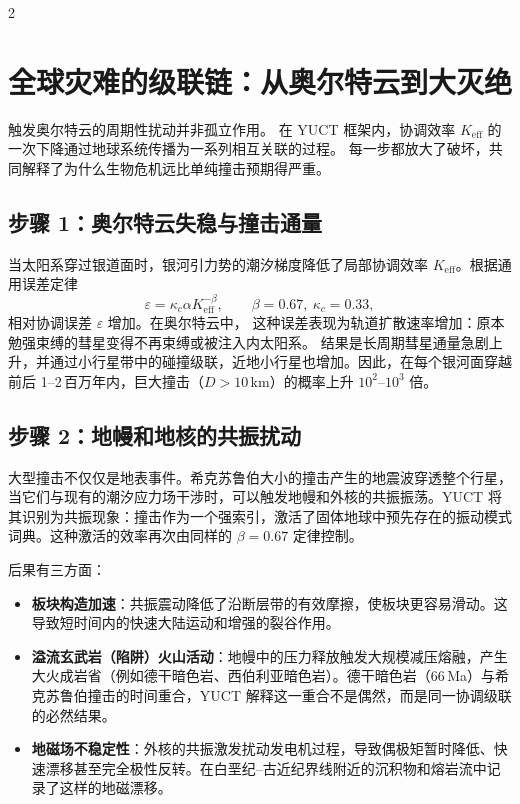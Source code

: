 \documentclass[11pt,a4paper]{article}
\begin{document}
	\begin{multicols}{2}
		
		\section{全球灾难的级联链：从奥尔特云到大灭绝}
		
		触发奥尔特云的周期性扰动并非孤立作用。
		在 YUCT 框架内，协调效率 \(K_{\mathrm{eff}}\) 的一次下降通过地球系统传播为一系列相互关联的过程。
		每一步都放大了破坏，共同解释了为什么生物危机远比单纯撞击预期得严重。
		
		\subsection{步骤 1：奥尔特云失稳与撞击通量}
		
		当太阳系穿过银道面时，银河引力势的潮汐梯度降低了局部协调效率
		\(K_{\mathrm{eff}}\)。根据通用误差定律
		\begin{equation}
			\varepsilon = \kappa_c \alpha K_{\mathrm{eff}}^{-\beta},\qquad \beta=0.67,\ \kappa_c=0.33,
		\end{equation}
		相对协调误差 \(\varepsilon\) 增加。在奥尔特云中，
		这种误差表现为轨道扩散速率增加：原本勉强束缚的彗星变得不再束缚或被注入内太阳系。
		结果是长周期彗星通量急剧上升，并通过小行星带中的碰撞级联，近地小行星也增加。因此，在每个银河面穿越前后 1–2 百万年内，巨大撞击（\(D>10\) km）的概率上升 \(10^2\)–\(10^3\) 倍。
		
		\subsection{步骤 2：地幔和地核的共振扰动}
		
		大型撞击不仅仅是地表事件。希克苏鲁伯大小的撞击产生的地震波穿透整个行星，当它们与现有的潮汐应力场干涉时，可以触发地幔和外核的共振振荡。YUCT 将其识别为共振现象：撞击作为一个强索引，激活了固体地球中预先存在的振动模式词典。这种激活的效率再次由同样的 \(\beta = 0.67\) 定律控制。
		
		后果有三方面：
		\begin{itemize}
			\item \textbf{板块构造加速}：共振震动降低了沿断层带的有效摩擦，使板块更容易滑动。这导致短时间内的快速大陆运动和增强的裂谷作用。
			\item \textbf{溢流玄武岩（陷阱）火山活动}：地幔中的压力释放触发大规模减压熔融，产生大火成岩省（例如德干暗色岩、西伯利亚暗色岩）。德干暗色岩（66 Ma）与希克苏鲁伯撞击的时间重合，YUCT 解释这一重合不是偶然，而是同一协调级联的必然结果。
			\item \textbf{地磁场不稳定性}：外核的共振激发扰动发电机过程，导致偶极矩暂时降低、快速漂移甚至完全极性反转。在白垩纪–古近纪界线附近的沉积物和熔岩流中记录了这样的地磁漂移。
		\end{itemize}
		

\end{multicols}
\end{document}
